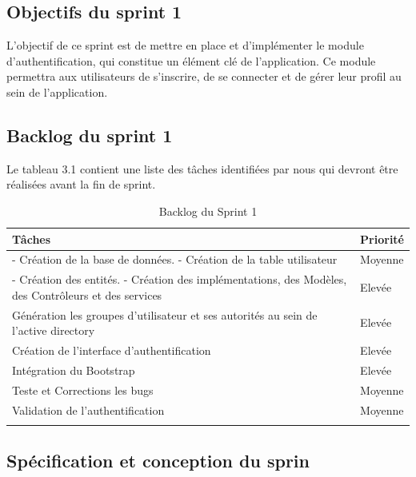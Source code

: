 \subsection{Objectifs du sprint 1}
    
L'objectif de ce sprint est de mettre en place et d'implémenter le module d'authentification, qui constitue un élément clé de l'application. Ce module permettra aux utilisateurs de s'inscrire, de se connecter et de gérer leur profil au sein de l'application.

    \subsection{Backlog du sprint 1}
    Le tableau 3.1 contient une liste des tâches identifiées par nous qui devront être réalisées avant la fin de sprint.
            \begin{longtable}{|m{8cm}|m{4cm}|}
            \hline 
            \textbf{Tâches} & \textbf{Priorité}\\
            \hline
            \endhead
            \endfoot
            \endlastfoot
            \hline  
            - Création de la base de données. \newline
            - Création de la table utilisateur & Moyenne \\
            \hline
            - Création des entités. \newline 
            - Création des implémentations, des Modèles, des Contrôleurs et des services & Elevée \\
            \hline 
            Génération les groupes d’utilisateur et ses autorités au sein de l’active directory & Elevée \\
            \hline 
            Création de l’interface d’authentification & Elevée \\
            \hline
            Intégration du Bootstrap & Elevée \\
            \hline\hline
            Teste et Corrections les bugs & Moyenne \\
            \hline
            Validation de l’authentification & Moyenne \\
            \hline
            \captionsetup{justification=centering,margin=2cm}    
            \caption{Backlog du Sprint 1}
            \end{longtable}

                        
    \subsection{Spécification et conception du sprin}
        
